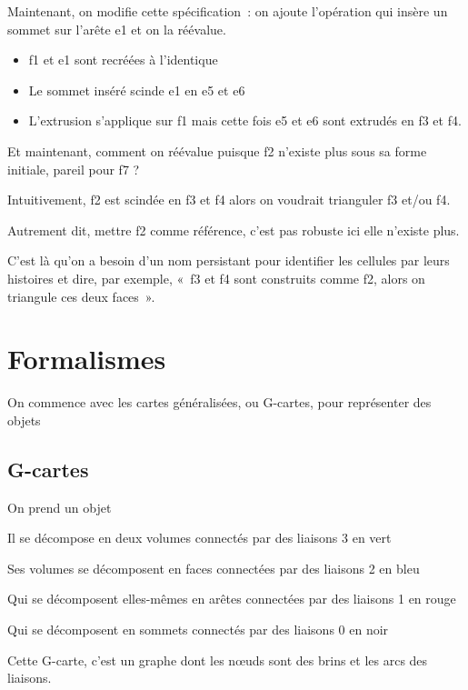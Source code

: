 \documentclass[a4paper]{article}
\begin{document}
Maintenant, on modifie cette spécification~: on ajoute l'opération qui
insère un sommet sur l'arête e1 et on la réévalue.

\begin{itemize}
	\item f1 et e1 sont recréées à l'identique
	\item Le sommet inséré scinde e1 en e5 et e6
	\item L'extrusion s'applique sur f1 mais cette fois e5 et e6 sont extrudés en f3 et
	      f4.
\end{itemize}

Et maintenant, comment on réévalue puisque f2 n'existe plus sous sa forme initiale,
pareil pour f7 ?

Intuitivement, f2 est scindée en f3 et f4 alors on voudrait trianguler f3 et/ou f4.

Autrement dit, mettre f2 comme référence, c'est pas robuste ici elle n'existe plus.

C'est là qu'on a besoin d'un nom persistant pour identifier les cellules par
leurs histoires et dire, par exemple, «~f3 et f4 sont construits comme f2, alors
on triangule ces deux faces~».



\section{Formalismes}



On commence avec les cartes généralisées, ou G-cartes, pour représenter des
objets



\subsection{G-cartes}


On prend un objet

Il se décompose en deux volumes connectés par des liaisons 3 en vert

Ses volumes se décomposent en faces connectées par des liaisons 2 en bleu

Qui se décomposent elles-mêmes en arêtes connectées par des liaisons 1 en rouge

Qui se décomposent en sommets connectés par des liaisons 0 en noir

Cette G-carte, c'est un graphe dont les nœuds sont des brins et les arcs des
liaisons.
\end{document}
